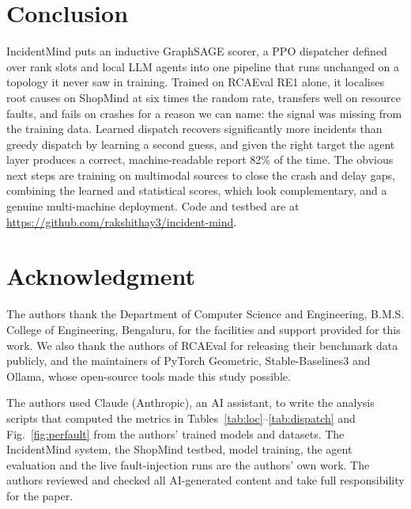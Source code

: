 \documentclass[conference,a4paper]{IEEEtran}
\begin{document}
\section{Conclusion}
IncidentMind puts an inductive GraphSAGE scorer, a PPO dispatcher defined over rank slots and local LLM agents into one pipeline that runs unchanged on a topology it never saw in training. Trained on RCAEval RE1 alone, it localises root causes on ShopMind at six times the random rate, transfers well on resource faults, and fails on crashes for a reason we can name: the signal was missing from the training data. Learned dispatch recovers significantly more incidents than greedy dispatch by learning a second guess, and given the right target the agent layer produces a correct, machine-readable report 82\% of the time. The obvious next steps are training on multimodal sources to close the crash and delay gaps, combining the learned and statistical scores, which look complementary, and a genuine multi-machine deployment. Code and testbed are at \url{https://github.com/rakshithay3/incident-mind}.

\section*{Acknowledgment}
The authors thank the Department of Computer Science and Engineering, B.M.S. College of Engineering, Bengaluru, for the facilities and support provided for this work. We also thank the authors of RCAEval for releasing their benchmark data publicly, and the maintainers of PyTorch Geometric, Stable-Baselines3 and Ollama, whose open-source tools made this study possible.

The authors used Claude (Anthropic), an AI assistant, to write the analysis scripts that computed the metrics in Tables~\ref{tab:loc}--\ref{tab:dispatch} and Fig.~\ref{fig:perfault} from the authors' trained models and datasets. The IncidentMind system, the ShopMind testbed, model training, the agent evaluation and the live fault-injection runs are the authors' own work. The authors reviewed and checked all AI-generated content and take full responsibility for the paper.
\end{document}
